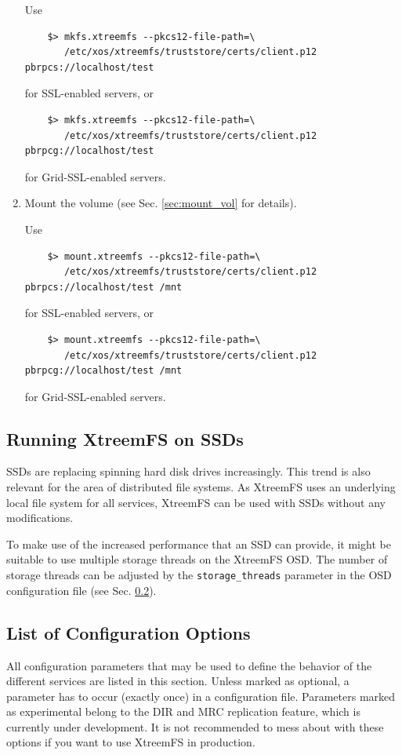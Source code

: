 \documentclass[a4paper,10pt]{book}
\begin{document}
\begin{enumerate}
	Use
	\begin{verbatim}
	$> mkfs.xtreemfs --pkcs12-file-path=\
	   /etc/xos/xtreemfs/truststore/certs/client.p12 pbrpcs://localhost/test
	\end{verbatim}
	for SSL-enabled servers, or
	\begin{verbatim}
	$> mkfs.xtreemfs --pkcs12-file-path=\
	   /etc/xos/xtreemfs/truststore/certs/client.p12 pbrpcg://localhost/test
	\end{verbatim}
	for Grid-SSL-enabled servers.

 \item Mount the volume (see Sec. \ref{sec:mount_vol} for details).

	Use
	\begin{verbatim}
	$> mount.xtreemfs --pkcs12-file-path=\
	   /etc/xos/xtreemfs/truststore/certs/client.p12 pbrpcs://localhost/test /mnt
	\end{verbatim}
	for SSL-enabled servers, or
	\begin{verbatim}
	$> mount.xtreemfs --pkcs12-file-path=\
	   /etc/xos/xtreemfs/truststore/certs/client.p12 pbrpcg://localhost/test /mnt
	\end{verbatim}
	for Grid-SSL-enabled servers.

\end{enumerate}


\subsection{Running XtreemFS on SSDs}
\label{sec:ssds}

SSDs are replacing spinning hard disk drives increasingly. This trend is also relevant for the area of distributed file systems. As XtreemFS uses an underlying local file system for all services, XtreemFS can be used with SSDs without any modifications.

To make use of the increased performance that an SSD can provide, it might be suitable to use multiple storage threads on the XtreemFS OSD. The number of storage threads can be adjusted by the \texttt{storage\_threads} parameter in the OSD configuration file (see Sec. \ref{sec:config}).


\subsection{List of Configuration Options}
\label{sec:config}

All configuration parameters that may be used to define the behavior of the different services are listed in this section. Unless marked as optional, a parameter has to occur (exactly once) in a configuration file. Parameters marked as experimental belong to the DIR and MRC replication feature, which is currently under development. It is not recommended to mess about with these options if you want to use XtreemFS in production.
\end{document}
